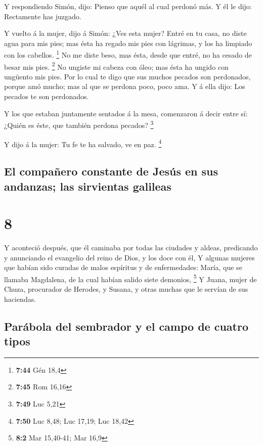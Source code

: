  Y respondiendo Simón, dijo: Pienso que aquél al cual
perdonó más. Y él le dijo: Rectamente has juzgado.

 Y vuelto á la mujer, dijo á Simón: ¿Ves esta mujer?
Entré en tu casa, no diste agua para mis pies; mas ésta ha regado mis
pies con lágrimas, y los ha limpiado con los cabellos. \footnote{\textbf{7:44}
  Gén 18,4}  No me diste beso, mas ésta, desde que entré,
no ha cesado de besar mis pies. \footnote{\textbf{7:45} Rom 16,16}
 No ungiste mi cabeza con óleo; mas ésta ha ungido con
ungüento mis pies.  Por lo cual te digo que sus muchos
pecados son perdonados, porque amó mucho; mas al que se perdona poco,
poco ama.  Y á ella dijo: Los pecados te son perdonados.

 Y los que estaban juntamente sentados á la mesa,
comenzaron á decir entre sí: ¿Quién es éste, que también perdona
pecados? \footnote{\textbf{7:49} Luc 5,21}

 Y dijo á la mujer: Tu fe te ha salvado, ve en paz.
\footnote{\textbf{7:50} Luc 8,48; Luc 17,19; Luc 18,42}

\hypertarget{el-compauxf1ero-constante-de-jesuxfas-en-sus-andanzas-las-sirvientas-galileas}{%
\subsection{El compañero constante de Jesús en sus andanzas; las
sirvientas
galileas}\label{el-compauxf1ero-constante-de-jesuxfas-en-sus-andanzas-las-sirvientas-galileas}}

\hypertarget{section-7}{%
\section{8}\label{section-7}}

 Y aconteció después, que él caminaba por todas las
ciudades y aldeas, predicando y anunciando el evangelio del reino de
Dios, y los doce con él,  Y algunas mujeres que habían
sido curadas de malos espíritus y de enfermedades: María, que se llamaba
Magdalena, de la cual habían salido siete demonios, \footnote{\textbf{8:2}
  Mar 15,40-41; Mar 16,9}  Y Juana, mujer de Chuza,
procurador de Herodes, y Susana, y otras muchas que le servían de sus
haciendas.

\hypertarget{paruxe1bola-del-sembrador-y-el-campo-de-cuatro-tipos}{%
\subsection{Parábola del sembrador y el campo de cuatro
tipos}\label{paruxe1bola-del-sembrador-y-el-campo-de-cuatro-tipos}}

